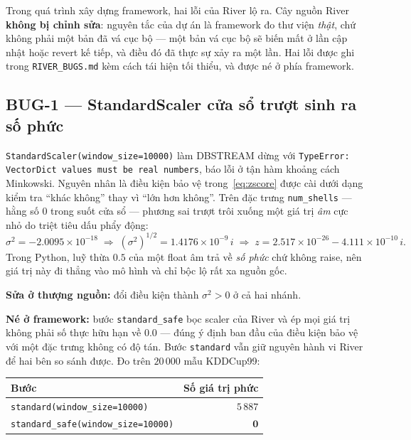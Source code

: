 \documentclass[11pt,a4paper]{article}
\theoremstyle{remark}
\begin{document}
Trong quá trình xây dựng framework, hai lỗi của River lộ ra. Cây nguồn River
\textbf{không bị chỉnh sửa}: nguyên tắc của dự án là framework đo thư viện
\emph{thật}, chứ không phải một bản đã vá cục bộ --- một bản vá cục bộ sẽ biến
mất ở lần cập nhật hoặc revert kế tiếp, và điều đó đã thực sự xảy ra một lần.
Hai lỗi được ghi trong \texttt{RIVER\_BUGS.md} kèm cách tái hiện tối thiểu, và
được né ở phía framework.

\subsection{BUG-1 --- StandardScaler cửa sổ trượt sinh ra số phức}
\label{sec:bug1}

\texttt{StandardScaler(window\_size=10000)} làm DBSTREAM dừng với
\texttt{TypeError: VectorDict values must be real numbers}, báo lỗi ở tận hàm
khoảng cách Minkowski. Nguyên nhân là điều kiện bảo vệ trong~\eqref{eq:zscore}
được cài dưới dạng kiểm tra ``khác không'' thay vì ``lớn hơn không''. Trên đặc
trưng \texttt{num\_shells} --- hằng số $0$ trong suốt cửa sổ --- phương sai trượt
trôi xuống một giá trị \emph{âm} cực nhỏ do triệt tiêu dấu phẩy động:
\[
  \sigma^2 = -2.0095 \times 10^{-18}
  \;\Longrightarrow\;
  (\sigma^2)^{1/2} = 1.4176\times10^{-9}\,i
  \;\Longrightarrow\;
  z = 2.517\times10^{-26} - 4.111\times10^{-10}\,i .
\]
Trong Python, luỹ thừa $0.5$ của một float âm trả về \emph{số phức} chứ không
raise, nên giá trị này đi thẳng vào mô hình và chỉ bộc lộ rất xa nguồn gốc.

\textbf{Sửa ở thượng nguồn:} đổi điều kiện thành $\sigma^2 > 0$ ở cả hai nhánh.

\textbf{Né ở framework:} bước \texttt{standard\_safe} bọc scaler của River và ép
mọi giá trị không phải số thực hữu hạn về $0.0$ --- đúng ý định ban đầu của điều
kiện bảo vệ với một đặc trưng không có độ tán. Bước \texttt{standard} vẫn giữ
nguyên hành vi River để hai bên so sánh được. Đo trên $20\,000$ mẫu KDDCup99:

\begin{center}
\small
\begin{tabular}{@{}lr@{}}
\toprule
\textbf{Bước} & \textbf{Số giá trị phức} \\
\midrule
\texttt{standard(window\_size=10000)} & $5\,887$ \\
\texttt{standard\_safe(window\_size=10000)} & $\mathbf{0}$ \\
\bottomrule
\end{tabular}
\end{center}
\end{document}

